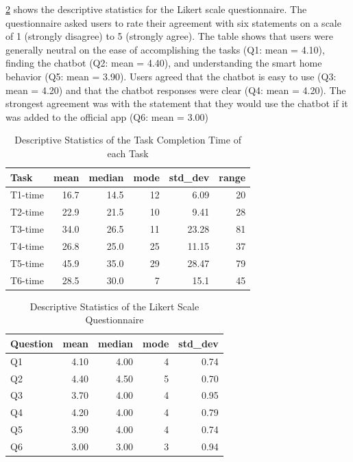 \cref{tab:descrQ} shows the descriptive statistics for the Likert scale questionnaire. The questionnaire asked users to rate their agreement with six statements on a scale of 1 (strongly disagree) to 5 (strongly agree). The table shows that users were generally neutral on the ease of accomplishing the tasks (Q1: mean = 4.10), finding the chatbot (Q2: mean = 4.40), and understanding the smart home behavior (Q5: mean = 3.90). Users agreed that the chatbot is easy to use (Q3: mean = 4.20) and that the chatbot responses were clear (Q4: mean = 4.20). The strongest agreement was with the statement that they would use the chatbot if it was added to the official app (Q6: mean = 3.00)

\begin{table}[h!]
    \centering
\begin{tabular}{lrrrrr}
    \toprule
    Task & mean & median & mode & std\_dev & range \\
    \midrule
    T1-time & 16.7 & 14.5 & 12 & 6.09 & 20 \\
    T2-time & 22.9 & 21.5 & 10 & 9.41 & 28 \\
    T3-time & 34.0 & 26.5 & 11 & 23.28 & 81 \\
    T4-time & 26.8 & 25.0& 25 & 11.15 & 37 \\
    T5-time & 45.9 & 35.0 & 29 & 28.47 & 79 \\
    T6-time & 28.5 & 30.0 & 7 & 15.1 & 45 \\
    \bottomrule
\end{tabular}
\caption{Descriptive Statistics of the Task Completion Time of each Task}
\label{tab:descrTime}
\end{table}

\begin{table}[h!]
    \centering
    \begin{tabular}{lrrrr}
        \toprule
        Question & mean & median & mode & std\_dev \\
        \midrule
        Q1 & 4.10 & 4.00 & 4 & 0.74 \\
        Q2 & 4.40 & 4.50 & 5 & 0.70 \\
        Q3 & 3.70 & 4.00 & 4 & 0.95 \\
        Q4 & 4.20 & 4.00 & 4 & 0.79 \\
        Q5 & 3.90 & 4.00 & 4 & 0.74 \\
        Q6 & 3.00 & 3.00 & 3 & 0.94 \\
        \bottomrule
        \end{tabular}   
\caption{Descriptive Statistics of the Likert Scale Questionnaire}
\label{tab:descrQ}
\end{table}

